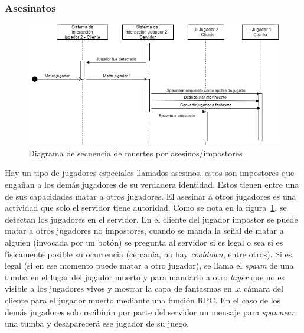 \subsubsection{Asesinatos}
\begin{figure}[H]
    \centering
    \includegraphics[width=1\linewidth]{images/diagrama_sec_matar.png}
    \caption{Diagrama de secuencia de muertes por asesinos/impostores}
    \label{fig:diagrama_sec_muertes_por_impost}
\end{figure}
Hay un tipo de jugadores especiales llamados asesinos, estos son impostores que engañan a los demás jugadores de su verdadera identidad. Estos tienen entre una de sus capacidades matar a otros jugadores. El asesinar a otros jugadores es una actividad que solo el servidor tiene autoridad.
Como se nota en la figura~\ref{fig:diagrama_sec_muertes_por_impost}, se detectan los jugadores en el servidor. En el cliente del jugador impostor se puede matar a otros jugadores no impostores, cuando se manda la señal de matar a alguien (invocada por un botón) se pregunta al servidor si es legal o sea si es físicamente posible su ocurrencia (cercanía, no hay \textit{cooldown}, entre otros). Si es legal (si en ese momento puede matar a otro jugador), se llama el \textit{spawn} de una tumba en el lugar del jugador muerto y para mandarlo a otro \textit{layer} que no es visible a los jugadores vivos y mostrar la capa de fantasmas en la cámara del cliente para el jugador muerto mediante una función RPC. En el caso de los demás jugadores solo recibirán por parte del servidor un mensaje para \textit{spawnear} una tumba y desaparecerá ese jugador de su juego.

